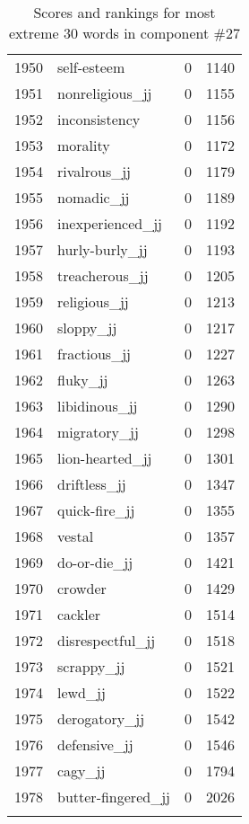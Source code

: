 \begin{longtable}[!htbp]{| rlr@{.}l |}
    1950 & self-esteem & 0 & 1140 \\
    1951 & nonreligious\_jj & 0 & 1155 \\
    1952 & inconsistency & 0 & 1156 \\
    1953 & morality & 0 & 1172 \\
    1954 & rivalrous\_jj & 0 & 1179 \\
    1955 & nomadic\_jj & 0 & 1189 \\
    1956 & inexperienced\_jj & 0 & 1192 \\
    1957 & hurly-burly\_jj & 0 & 1193 \\
    1958 & treacherous\_jj & 0 & 1205 \\
    1959 & religious\_jj & 0 & 1213 \\
    1960 & sloppy\_jj & 0 & 1217 \\
    1961 & fractious\_jj & 0 & 1227 \\
    1962 & fluky\_jj & 0 & 1263 \\
    1963 & libidinous\_jj & 0 & 1290 \\
    1964 & migratory\_jj & 0 & 1298 \\
    1965 & lion-hearted\_jj & 0 & 1301 \\
    1966 & driftless\_jj & 0 & 1347 \\
    1967 & quick-fire\_jj & 0 & 1355 \\
    1968 & vestal & 0 & 1357 \\
    1969 & do-or-die\_jj & 0 & 1421 \\
    1970 & crowder & 0 & 1429 \\
    1971 & cackler & 0 & 1514 \\
    1972 & disrespectful\_jj & 0 & 1518 \\
    1973 & scrappy\_jj & 0 & 1521 \\
    1974 & lewd\_jj & 0 & 1522 \\
    1975 & derogatory\_jj & 0 & 1542 \\
    1976 & defensive\_jj & 0 & 1546 \\
    1977 & cagy\_jj & 0 & 1794 \\
    1978 & butter-fingered\_jj & 0 & 2026 \\
    \hline
    \caption{Scores and rankings for most extreme 30 words in component \#27} \\
\end{longtable}
